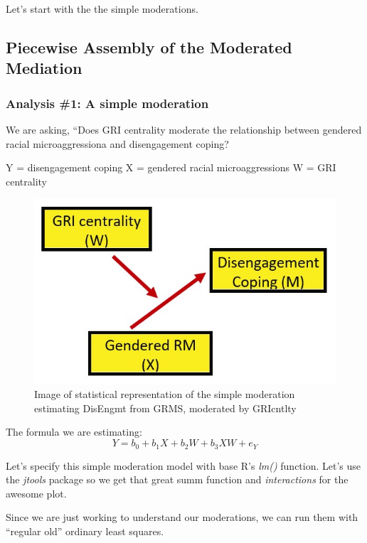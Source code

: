 \documentclass[
  11pt,
]{book}
\begin{document}
Let's start with the the simple moderations.

\hypertarget{piecewise-assembly-of-the-moderated-mediation}{%
\subsection{Piecewise Assembly of the Moderated Mediation}\label{piecewise-assembly-of-the-moderated-mediation}}

\hypertarget{analysis-1-a-simple-moderation}{%
\subsubsection{Analysis \#1: A simple moderation}\label{analysis-1-a-simple-moderation}}

We are asking, ``Does GRI centrality moderate the relationship between gendered racial microaggressiona and disengagement coping?

Y = disengagement coping X = gendered racial microaggressions W = GRI centrality

\begin{figure}
\centering
\includegraphics{images/ModMed/LewisMod1.jpg}
\caption{Image of statistical representation of the simple moderation estimating DisEngmt from GRMS, moderated by GRIcntlty}
\end{figure}

The formula we are estimating: \[Y=b_{0}+b_{1}X+b_{2}W+b_{3}XW+e_{Y}\]

Let's specify this simple moderation model with base R's \emph{lm()} function. Let's use the \emph{jtools} package so we get that great summ function and \emph{interactions} for the awesome plot.

Since we are just working to understand our moderations, we can run them with ``regular old'' ordinary least squares.
\end{document}
